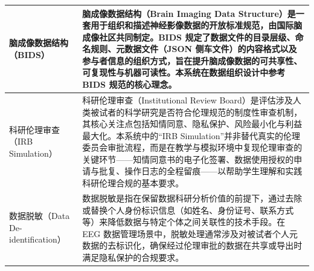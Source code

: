 \begin{longtable}{|p{36mm}|p{116mm}|}
脑成像数据结构（BIDS） &
脑成像数据结构（Brain Imaging Data Structure）是一套用于组织和描述神经影像数据的开放标准规范，由国际脑成像社区共同制定。BIDS 规定了数据文件的目录层级、命名规则、元数据文件（JSON 侧车文件）的内容格式以及参与者信息的组织方式，旨在提升脑成像数据的可共享性、可复现性与机器可读性。本系统在数据组织设计中参考 BIDS 规范的核心理念。 \\
\hline

科研伦理审查（IRB Simulation） &
科研伦理审查（Institutional Review Board）是评估涉及人类被试者的科学研究是否符合伦理规范的制度性审查机制，其核心关注点包括知情同意、隐私保护、风险最小化与利益最大化。本系统中的``IRB Simulation''并非替代真实的伦理委员会审批流程，而是在教学与模拟环境中复现伦理审查的关键环节——知情同意书的电子化签署、数据使用授权的申请与批复、操作日志的全程留痕——以帮助学生理解和实践科研伦理合规的基本要求。 \\
\hline

数据脱敏（Data De-identification） &
数据脱敏是指在保留数据科研分析价值的前提下，通过去除或替换个人身份标识信息（如姓名、身份证号、联系方式等）来降低数据与特定个体之间关联性的技术手段。在 EEG 数据管理场景中，脱敏处理通常涉及对被试者个人元数据的去标识化，确保经过伦理审批的数据在共享或导出时满足隐私保护的合规要求。 \\
\hline

\end{longtable}
